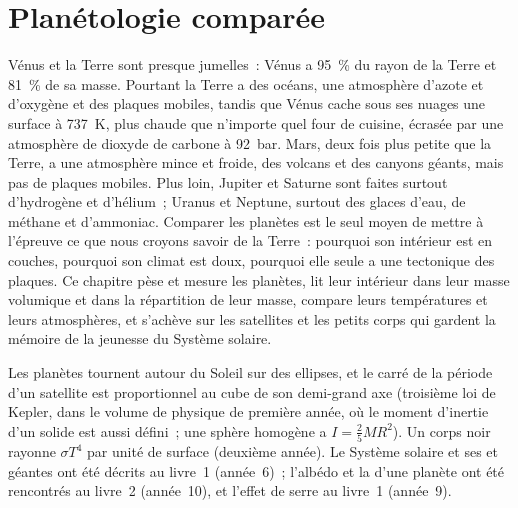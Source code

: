 \chapter{Planétologie comparée}\label{ch:b1:comparative-planetology}

Vénus et la Terre sont presque jumelles~: Vénus a \qty{95}{\percent} du rayon de
la Terre et \qty{81}{\percent} de sa masse. Pourtant la Terre a des océans, une
atmosphère d'azote et d'oxygène et des plaques mobiles, tandis que Vénus cache
sous ses nuages une surface à \qty{737}{K}, plus chaude que n'importe quel four
de cuisine, écrasée par une atmosphère de dioxyde de carbone à \qty{92}{bar}.
Mars, deux fois plus petite que la Terre, a une atmosphère mince et froide, des
volcans et des canyons géants, mais pas de plaques mobiles. Plus loin, Jupiter
et Saturne sont faites surtout d'hydrogène et d'hélium~; Uranus et Neptune,
surtout des glaces d'eau, de méthane et d'ammoniac. Comparer les planètes est le
seul moyen de mettre à l'épreuve ce que nous croyons savoir de la Terre~:
pourquoi son intérieur est en couches, pourquoi son climat est doux, pourquoi
elle seule a une tectonique des plaques. Ce chapitre pèse et mesure les
planètes, lit leur intérieur dans leur masse volumique et dans la répartition de
leur masse, compare leurs températures et leurs atmosphères, et s'achève sur
les satellites et les petits corps qui gardent la mémoire de la jeunesse du
Système solaire.

\begin{recall}
Les planètes tournent autour du Soleil sur des ellipses, et le carré de la
période d'un satellite est proportionnel au cube de son demi-grand axe
(troisième loi de Kepler, dans le volume de physique de première année, où le
moment d'inertie d'un solide est aussi défini~; une sphère homogène a
$I = \tfrac25MR^2$). Un corps noir rayonne $\sigma T^4$ par unité de surface
(deuxième année). Le Système solaire et ses  et géantes ont
été décrits au livre~1 (année~6)~; l'albédo et la  d'une
planète ont été rencontrés au livre~2 (année~10), et l'effet de serre au
livre~1 (année~9).
\end{recall}

